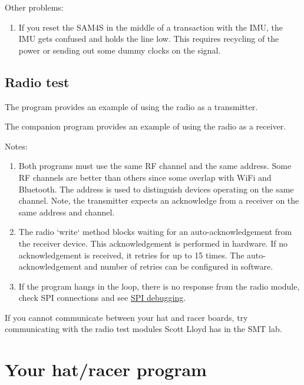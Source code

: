 Other problems:
%
\begin{enumerate}
\item If you reset the SAM4S in the middle of a transaction with the
IMU, the IMU gets confused and holds the  line low. This
requires recycling of the power or sending out some dummy clocks on
the  signal.
\end{enumerate}


\subsection{Radio test}
\label{radio-test}

The program  provides
an example of using the radio as a transmitter.

The companion program
 provides an example
of using the radio as a receiver.

Notes:
%
\begin{enumerate}
\item
  Both programs must use the same RF channel and the same address. Some
  RF channels are better than others since some overlap with WiFi
  and Bluetooth. The address is used to distinguish devices
  operating on the same channel. Note, the transmitter expects an
  acknowledge from a receiver on the same address and channel.
\item
  The radio `write` method blocks waiting for an auto-acknowledgement
  from the receiver device. This acknowledgement is performed in
  hardware. If no acknowledgement is received, it retries for up to 15
  times. The auto-acknowledgement and number of retries can be
  configured in software.

\item If the program hangs in the  loop, there is no
  response from the radio module, check SPI connections and see
  \hyperref[debugging_Spi]{SPI debugging}.
  
\end{enumerate}

If you cannot communicate between your hat and racer boards, try
communicating with the radio test modules Scott Lloyd has in the SMT
lab.

\section{Your hat/racer program}
\label{your-hatracer-program}

